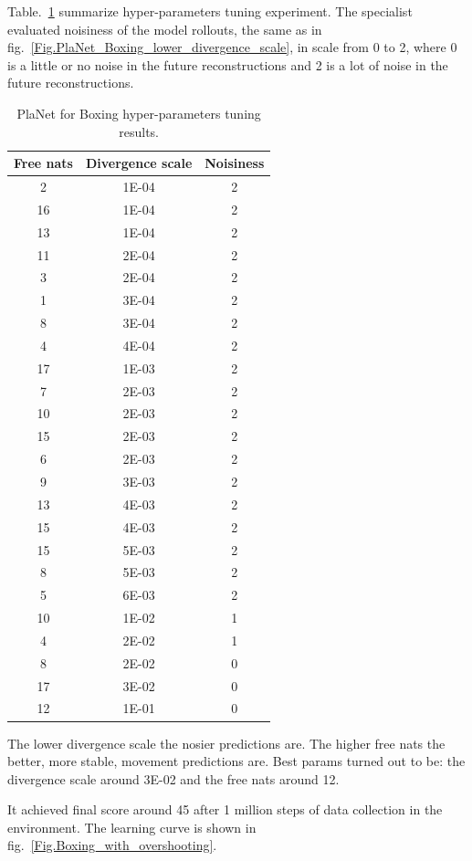 Table.~\ref{Table.PlaNet_Boxing_tuning} summarize hyper-parameters tuning experiment. The specialist evaluated noisiness of the model rollouts, the same as in fig.~\ref{Fig.PlaNet_Boxing_lower_divergence_scale}, in scale from 0 to 2, where 0 is a little or no noise in the future reconstructions and 2 is a lot of noise in the future reconstructions.

\begin{table}[H]
\centering
\begin{tabular}{| c | c | c |} 
\hline
Free nats & Divergence scale & Noisiness \\
\hline
2  & 1E-04 & 2 \\
16 & 1E-04 & 2 \\
13 & 1E-04 & 2 \\
11 & 2E-04 & 2 \\
3  & 2E-04 & 2 \\
1  & 3E-04 & 2 \\
8  & 3E-04 & 2 \\
4  & 4E-04 & 2 \\
17 & 1E-03 & 2 \\
7  & 2E-03 & 2 \\
10 & 2E-03 & 2 \\
15 & 2E-03 & 2 \\
6  & 2E-03 & 2 \\
9  & 3E-03 & 2 \\
13 & 4E-03 & 2 \\
15 & 4E-03 & 2 \\
15 & 5E-03 & 2 \\
8  & 5E-03 & 2 \\
5  & 6E-03 & 2 \\
10 & 1E-02 & 1 \\
4  & 2E-02 & 1 \\
8  & 2E-02 & 0 \\
17 & 3E-02 & 0 \\
12 & 1E-01 & 0 \\
\hline
\end{tabular}
\caption{PlaNet for Boxing hyper-parameters tuning results.}
\label{Table.PlaNet_Boxing_tuning}
\end{table}

The lower divergence scale the nosier predictions are. The higher free nats the better, more stable, movement predictions are. Best params turned out to be: the divergence scale around 3E-02 and the free nats around 12.

It achieved final score around 45 after 1 million steps of data collection in the environment. The learning curve is shown in fig.~\ref{Fig.Boxing_with_overshooting}.

